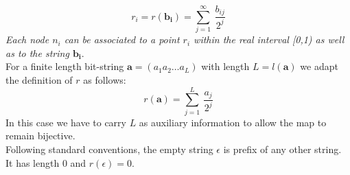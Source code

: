 \documentclass[11pt,a4paper,twoside,openright]{book}
\begin{document}
\begin{equation}
r_{i}=r(\mathbf{b_{i}})=\sum_{j=1}^{\infty} \ \frac{b_{ij}}{2^{j}}
\end{equation}
\emph{Each node $n_{i}$ can be associated to a point $r_{i}$ within the real interval [0,1) as well as to the string $\mathbf{b_{i}}$}.\\
For a finite length bit-string $\mathbf{a}=(a_{1}a_{2}\ldots a_{L})$ with length $L=l(\mathbf{a})$ we adapt the definition of $r$ as follows:
\begin{equation}
r(\mathbf{a})=\sum_{j=1}^{L} \ \frac{a_{j}}{2^{j}}
\end{equation}
In this case we have to carry $L$ as auxiliary information to allow the map to remain bijective.\\
Following standard conventions, the empty string $\epsilon$ is prefix of any other string. It has length 0 and $r(\epsilon)=0$.

\end{document}
